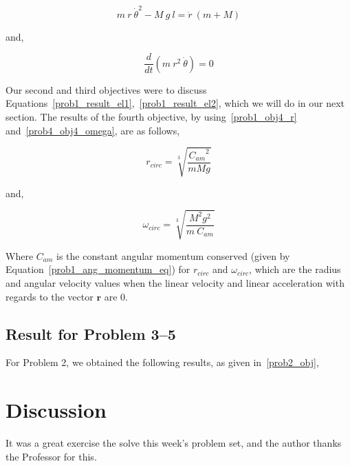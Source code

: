 \documentclass[conference]{IEEEtran}
\begin{document}
\begin{equation}\label{prob1_result_el1}
    \boxed{
        m~r~\dot{\theta}^2 - M~g~l = \ddot{r}~(m + M)
    }
\end{equation}

and,

\begin{equation}\label{prob1_result_el2}
    \boxed{
        \frac{d}{dt}\left( m~r^2~\dot{\theta} \right) = 0
    }
\end{equation}

Our second and third objectives were to discuss Equations~\ref{prob1_result_el1},~\ref{prob1_result_el2},
which we will do in our next section. The results of the fourth objective, by using~\ref{prob1_obj4_r}
and~\ref{prob4_obj4_omega}, are as follows,

\begin{equation}
    \boxed{r_{circ} = \sqrt[3]{\frac{{C_{am}}^2}{mMg}}}
\end{equation}

and,

\begin{equation}
    \boxed{\omega_{circ} = \sqrt[3]{\frac{M^2g^2}{m~C_{am}}}}
\end{equation}

Where $C_{am}$ is the constant angular momentum conserved (given by Equation~\ref{prob1_ang_momentum_eq}) for $r_{circ}$ and $\omega_{circ}$,
which are the radius and angular velocity values when the linear velocity and linear acceleration with
regards to the vector $\textbf{r}$ are 0.

\subsection{Result for Problem 3--5}

For Problem 2, we obtained the following results, as given in~\ref{prob2_obj},

        

\section{Discussion}

It was a great exercise the solve this week's problem set, and the author thanks
the Professor for this.


\end{document}
